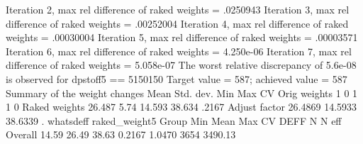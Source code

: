  Iteration 2, max rel difference of raked weights = .0250943
 Iteration 3, max rel difference of raked weights = .00252004
 Iteration 4, max rel difference of raked weights = .00030004
 Iteration 5, max rel difference of raked weights = .00003571
 Iteration 6, max rel difference of raked weights = 4.250e-06
 Iteration 7, max rel difference of raked weights = 5.058e-07
The worst relative discrepancy of  5.6e-08 is observed for dpstoff5 == 5150150     
Target value =        587; achieved value =        587
{\smallskip}
   Summary of the weight changes
{\smallskip}
              {\VBAR}    Mean    Std. dev.    Min        Max       CV
Orig weights  {\VBAR}        1          0         1           1       0
Raked weights {\VBAR}   26.487       5.74    14.593      38.634   .2167
Adjust factor {\VBAR}  26.4869              14.5933     38.6339
{\smallskip}
. whatsdeff raked_weight5
{\smallskip}
    Group     {\VBAR}   Min     {\VBAR}   Mean    {\VBAR}   Max     {\VBAR}    CV   {\VBAR}   DEFF  {\VBAR}   N   {\VBAR}  N eff
      Overall {\VBAR}     14.59 {\VBAR}     26.49 {\VBAR}     38.63 {\VBAR}  0.2167 {\VBAR}  1.0470 {\VBAR}  3654 {\VBAR} 3490.13
{\smallskip}
